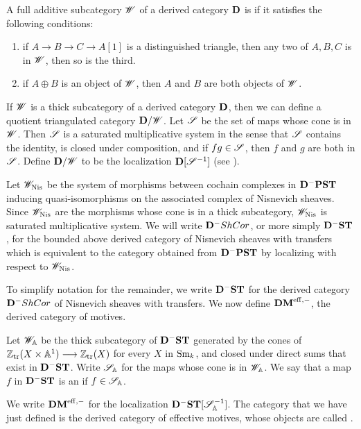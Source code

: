 \begin{defn}
A full additive subcategory $\Cat{W}$ of a derived category 
$\DCat$ is  if it satisfies the following conditions:
\begin{enumerate}
\item if $A \to B \to C \to A[1]$ is a distinguished triangle, then
any two of $A, B, C$ is in $\Cat{W}$, then so is the third.

\item if $A \oplus B$ is an object of $\Cat{W}$, then $A$ and $B$ 
are both objects of $\Cat{W}$.
\end{enumerate}
\end{defn}

If $\Cat{W}$ is a thick subcategory of a derived category $\DCat$,
then we can define a quotient triangulated category 
$\DCat/\Cat{W}$. Let $\Cat{S}$ be the set of maps whose cone is in 
$\Cat{W}$. Then $\Cat{S}$ is a saturated multiplicative system in 
the sense that $\Cat{S}$ contains the identity, is closed under 
composition, and if $fg \in \Cat{S}$, then $f$ and $g$ are both in 
$\Cat{S}$. Define $\DCat/\Cat{W}$ to be the localization 
$\DCat[D] [\Cat{S}^{-1}]$ (see \cite{Verd96}).

Let $\Cat{W}_{\Nis}$ be the system of morphisms between cochain
complexes in $\DCat^-\PST$ inducing quasi-isomorphisms on the
associated complex of Nisnevich sheaves. Since $\Cat{W}_{\Nis}$ are
the morphisms whose cone is in a thick subcategory, $\Cat{W}_{\Nis}$
is saturated multiplicative system.  We will write $\DCat^-\ShCor$, or
more simply $\DShCor$, for the bounded above derived category of
Nisnevich sheaves with transfers which is equivalent to the category
obtained from $\DCat^- \PST$ by localizing with respect to
$\Cat{W}_{\Nis}$.


To simplify notation for the remainder, we write $\DShCor$ for the
derived category $\DCat^-\ShCor$ of Nisnevich sheaves with
transfers. We now define $\DMeff$, the derived category of motives.

\begin{defn}\label{def_DMeff}
Let $\Cat{W}_{\A}$ be the thick subcategory of $\DShCor$ generated by
the cones of $\Ztr(X \times \A^1) \to \Ztr(X)$ for every $X$ in $\Sm$,
and closed under direct sums that exist in $\DShCor$.  Write
$\Cat{S}_{\A}$ for the maps whose cone is in $\Cat{W}_{\A}$.  We say
that a map $f$ in $\DShCor$ is an  if
$f \in \Cat{S}_{\A}$.

We write $\DMeff$ for the localization 
$\DShCor [\Cat{S}_{\A}^{-1}]$. The category that we have
just defined is the derived category of effective motives, whose objects are
called .
\end{defn}

